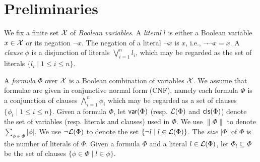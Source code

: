 \section{Preliminaries}\label{sec:prel}

We fix a finite set  $\mathcal{X}$ of \emph{Boolean variables}.
A \emph{literal} $l$ is either a Boolean variable $x\in \mathcal{X}$ or its negation $\neg x$.
The negation of a literal $\neg x$ is $x$, i.e., $\neg\neg x=x$.
A \emph{clause} $\phi$ is a disjunction of literals $\bigvee_{i=1}^n l_i$, which may be regarded as
the set of literals $\{l_i\mid 1\leq i\leq n\}$.

A \emph{formula} $\Phi$ over $\mathcal{X}$ is a Boolean combination of variables $\mathcal{X}$.
We assume that formulae are given in conjunctive normal
form (CNF), namely each formula $\Phi$ is a conjunction of clauses $\bigwedge_{i=1}^n\phi_i$ which may be regarded as a set of clauses $\{\phi_i\mid 1\leq i\leq n\}$. Given a formula $\Phi$, let $\textsf{var}(\Phi)$ (resp. ${\cal L}(\Phi)$  and $\textsf{cls}(\Phi)$) denote the set of variables (resp. literals and clauses) used in $\Phi$.
We use $\|\Phi\|$ to denote $\sum_{\phi\in\Phi}|\phi|$.
We use $\neg{\cal L}(\Phi)$ to denote the set $\{\neg l \mid l\in {\cal L}(\Phi)\}$.
The \emph{size} $|\Phi|$ of $\Phi$ is the number of literals of $\Phi$.
Given a formula $\Phi$ and a literal $l\in{\cal L}(\Phi)$,
let $\Phi_{l}\subseteq \Phi$ be the set of clauses $\{\phi\in\Phi\mid l\in\phi\}$.


